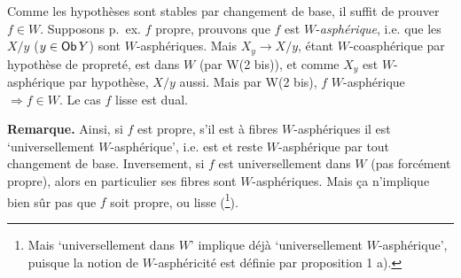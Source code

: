 \leavevmode{}Comme les hypothèses sont stables par changement de base, il suffit de prouver $f\in W$. Supposons p.~ex. $f$ propre, prouvons que $f$ est $W$-\textit{asphérique}, i.e. que les $X/y$ ($y\in\mathsf{Ob}\,Y$) sont $W$-asphériques. Mais $X_y\longrightarrow X/y$, étant $W$-coasphérique par hypothèse de propreté, est dans $W$ (par W(2 bis)), et comme $X_y$ est $W$-asphérique par hypothèse, $X/y$ aussi. Mais par W(2 bis), $f$ $W$-asphérique $\Longrightarrow f\in W$. Le cas $f$ lisse est dual.

\textbf{Remarque.} Ainsi, si $f$ est propre, s'il est à fibres $W$-asphériques il est `universellement $W$-asphérique', i.e. est et reste $W$-asphérique par tout changement de base. Inversement, si $f$ est universellement dans $W$ (pas forcément propre), alors en particulier ses fibres sont $W$-asphériques. Mais ça n'implique bien sûr pas que $f$ soit propre, ou lisse (\footnote[44]{Mais `universellement dans $W$' implique déjà `universellement $W$-asphérique', puisque la notion de $W$-asphéricité est définie par proposition 1 a).}).

